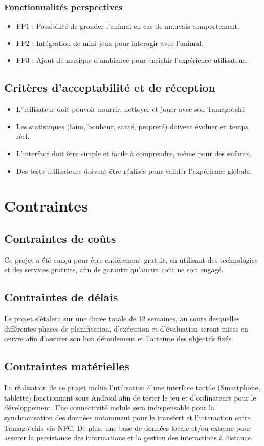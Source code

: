 \documentclass{cahier_des_charges}
\begin{document}
\subsubsection{Fonctionnalités perspectives}
\begin{itemize}[label=\textendash]
\item FP1 : Possibilité de gronder l’animal en cas de mauvais comportement.

\item FP2 : Intégration de mini-jeux pour interagir avec l’animal.

\item FP3 : Ajout de musique d’ambiance pour enrichir l’expérience utilisateur.
\end{itemize}
\subsection{Critères d’acceptabilité et de réception}
\begin{itemize}[label=\textbullet]
\item L'utilisateur doit pouvoir nourrir, nettoyer et jouer avec son Tamagotchi.
\item Les statistiques (faim, bonheur, santé, propreté) doivent évoluer en temps réel.
\item L'interface doit être simple et facile à comprendre, même pour des enfants.
\item Des tests utilisateurs doivent être réalisés pour valider l'expérience globale.
\end{itemize}
\section{Contraintes}
\subsection{Contraintes de coûts}
Ce projet a été conçu pour être entièrement gratuit, en utilisant des technologies et des services gratuits, afin de garantir qu'aucun coût ne soit engagé.
\subsection{Contraintes de délais}
Le projet s'étalera sur une durée totale de 12 semaines, au cours desquelles différentes phases de planification, d'exécution et d'évaluation seront mises en œuvre afin d'assurer son bon déroulement et l'atteinte des objectifs fixés.
\subsection{Contraintes matérielles}
La réalisation de ce projet inclue l’utilisation d’une interface tactile (Smartphone, tablette) fonctionnant sous Android afin de tester le jeu et d’ordinateurs pour le développement. Une connectivité mobile sera indispensable pour la synchronisation des données notamment pour le transfert et l’interaction entre Tamagotchis via NFC.
De plus, une base de données locale et/ou externe pour assurer la persistance des informations et la gestion des interactions à distance.
\end{document}
